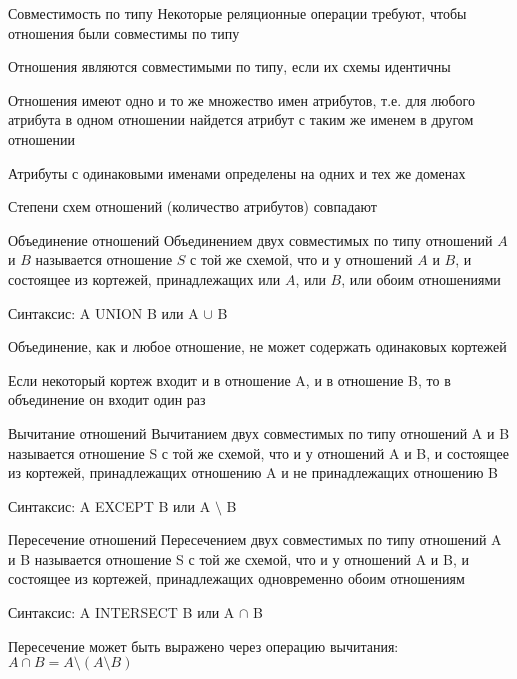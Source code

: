 \documentclass[12pt]{article}
\begin{document}
\begin{nota}{Совместимость по типу}
    Некоторые реляционные операции требуют, чтобы отношения были совместимы по типу 

    Отношения являются совместимыми по типу, если их схемы идентичны 

    Отношения имеют одно и то же множество имен атрибутов, т.е. для любого атрибута в одном отношении найдется атрибут с таким же именем в другом отношении 

    Атрибуты с одинаковыми именами определены на одних и тех же доменах 

    Степени схем отношений (количество атрибутов) совпадают 
\end{nota}

\begin{defin}{Объединение отношений}
    Объединением двух совместимых по типу отношений $A$ и $B$ называется отношение $S$ с той же схемой, что и у отношений $A$ и $B$, и состоящее из кортежей, принадлежащих или $A$, или $B$, или обоим отношениями

    Синтаксис: A UNION B или A $\cup$ B

    \begin{Remark}{}
        Объединение, как и любое отношение, не может содержать одинаковых кортежей 

        Если некоторый кортеж входит и в отношение A, и в отношение B, то в объединение он входит один раз
    \end{Remark}
\end{defin}

\begin{defin}{Вычитание отношений}
    Вычитанием двух совместимых по типу отношений A и B называется отношение S с той же схемой, что и у отношений A и B, и состоящее из кортежей, принадлежащих отношению A и не принадлежащих отношению B 

    Синтаксис: A EXCEPT B или A $\setminus$ B
\end{defin}

\begin{defin}{Пересечение отношений}
    Пересечением двух совместимых по типу отношений A и B называется отношение S с той же схемой, что и у отношений A и B, и состоящее из кортежей, принадлежащих одновременно обоим отношениям 

    Синтаксис: A INTERSECT B или A $\cap$ B 

    \begin{Remark}{}
        Пересечение может быть выражено через операцию вычитания: $A \cap B = A \setminus (A \setminus B)$
    \end{Remark}
\end{defin}
\end{document}
